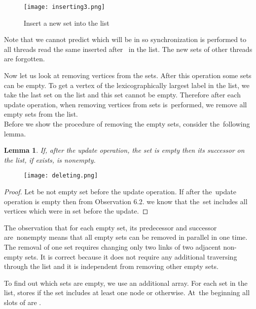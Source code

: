 \documentclass[a4paper, 11pt]{article}
\newtheorem{lm}[tw]{Lemma}
\begin{document}
\begin{figure}[h]
    \begin{center}
        \texttt{[image: inserting3.png]}
        \caption{Insert a new set  into the list }
    \end{center}
\end{figure}

Note that we cannot predict which  will be in  so synchronization is performed 
to all threads read the same  inserted after~ in the list. The new sets of other 
threads are forgotten.

Now let us look at removing vertices from the sets. After this operation some sets can be empty. 
To get a vertex of the lexicographically largest label in the list, we take the last set on the 
list and this set cannot be empty. Therefore after each update operation, when removing vertices 
from sets is~performed, we remove all empty sets from the list.\\
\newpage
Before we show the procedure of removing the empty sets, consider the~following lemma. 

\begin{lm}
    If, after the update operation, the set  is empty then its successor on the list, if
    exists, is nonempty.
\end{lm}

\begin{figure}[h]
    \begin{center}
        \texttt{[image: deleting.png]}
    \end{center}
\end{figure}

\begin{proof}
    Let  be not empty set before the update operation. If after the~update operation 
     is empty then from Observation 6.2. we know that the~set  includes all 
    vertices which were in set  before the update. 
\end{proof}

The observation that for each empty set, its predecessor and successor are~nonempty means that 
all empty sets can be removed in parallel in one time. The removal of one set requires changing 
only two links of two adjacent non-empty sets. It is correct because it does not require any 
additional traversing through the list and it is independent from removing other empty sets.

To find out which sets are empty, we use an additional  array. For each set in the list,
 stores  if the set includes at least one node or  otherwise. At~the beginning 
all slots of  are . 
\end{document}
